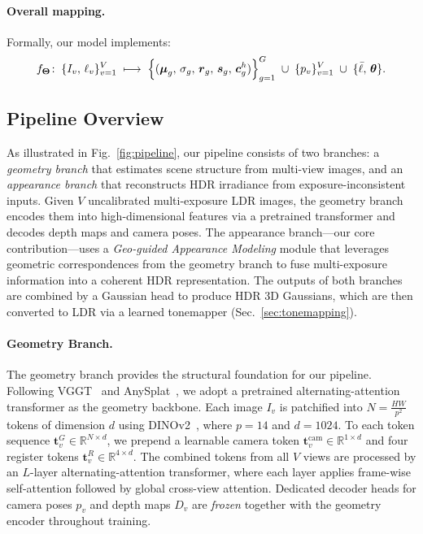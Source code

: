 \documentclass[runningheads]{llncs}
\begin{document}
\paragraph{\textbf{Overall mapping.}}
Formally, our model implements:
\begin{equation}
    f_{\boldsymbol{\Theta}}\!:\;
    \{I_v,\, \ell_v\}_{v=1}^{V}
    \;\longmapsto\;
    \Bigl\{(\boldsymbol{\mu}_g,\, \sigma_g,\, \boldsymbol{r}_g,\, \boldsymbol{s}_g,\, \boldsymbol{c}_g^{h})\Bigr\}_{g=1}^{G}
    \;\cup\;
    \{p_v\}_{v=1}^{V}
    \;\cup\;
    \{\bar{\ell},\, \boldsymbol{\theta}\}.
\label{eq:mapping}
\end{equation}



\subsection{Pipeline Overview}
\label{sec:pipeline}

As illustrated in Fig.~\ref{fig:pipeline}, our pipeline consists of two branches: a \emph{geometry branch} that estimates scene structure from multi-view images, and an \emph{appearance branch} that reconstructs HDR irradiance from exposure-inconsistent inputs.
Given $V$ uncalibrated multi-exposure LDR images, the geometry branch encodes them into high-dimensional features via a pretrained transformer and decodes depth maps and camera poses.
The appearance branch---our core contribution---uses a \emph{Geo-guided Appearance Modeling} module that leverages geometric correspondences from the geometry branch to fuse multi-exposure information into a coherent HDR representation.
The outputs of both branches are combined by a Gaussian head to produce HDR 3D Gaussians, which are then converted to LDR via a learned tonemapper (Sec.~\ref{sec:tonemapping}).


\paragraph{\textbf{Geometry Branch.}}
The geometry branch provides the structural foundation for our pipeline.
Following VGGT~\cite{wang2025vggt} and AnySplat~\cite{jiang2025anysplat}, we adopt a pretrained alternating-attention transformer as the geometry backbone.
Each image $I_v$ is patchified into $N = \tfrac{HW}{p^{2}}$ tokens of dimension $d$ using DINOv2~\cite{oquab2023dinov2}, where $p{=}14$ and $d{=}1024$.
To each token sequence $\boldsymbol{t}_v^{G} \in \mathbb{R}^{N \times d}$, we prepend a learnable camera token $\boldsymbol{t}_v^{\text{cam}} \in \mathbb{R}^{1 \times d}$ and four register tokens $\boldsymbol{t}_v^{R} \in \mathbb{R}^{4 \times d}$.
The combined tokens from all $V$ views are processed by an $L$-layer alternating-attention transformer, where each layer applies frame-wise self-attention followed by global cross-view attention.
Dedicated decoder heads for camera poses $p_v$ and depth maps $D_v$ are \emph{frozen} together with the geometry encoder throughout training.
\end{document}
